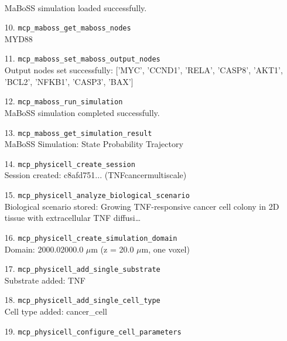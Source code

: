 \begin{enumerate}
\hfill\\
\RaggedRight MaBoSS simulation loaded successfully.
\item[10.] \texttt{mcp\_\allowbreak{}maboss\_\allowbreak{}get\_\allowbreak{}maboss\_\allowbreak{}nodes}
\hfill\\
\RaggedRight MYD88
\item[11.] \texttt{mcp\_\allowbreak{}maboss\_\allowbreak{}set\_\allowbreak{}maboss\_\allowbreak{}output\_\allowbreak{}nodes}
\hfill\\
\RaggedRight Output nodes set successfully: ['MYC', 'CCND1', 'RELA', 'CASP8', 'AKT1', 'BCL2', 'NFKB1', 'CASP3', 'BAX']
\item[12.] \texttt{mcp\_\allowbreak{}maboss\_\allowbreak{}run\_\allowbreak{}simulation}
\hfill\\
\RaggedRight MaBoSS simulation completed successfully.
\item[13.] \texttt{mcp\_\allowbreak{}maboss\_\allowbreak{}get\_\allowbreak{}simulation\_\allowbreak{}result}
\hfill\\
\RaggedRight MaBoSS Simulation: State Probability Trajectory
\item[14.] \texttt{mcp\_\allowbreak{}physicell\_\allowbreak{}create\_\allowbreak{}session}
\hfill\\
\RaggedRight Session created: c8afd751... (TNFcancermultiscale)
\item[15.] \texttt{mcp\_\allowbreak{}physicell\_\allowbreak{}analyze\_\allowbreak{}biological\_\allowbreak{}scenario}
\hfill\\
\RaggedRight Biological scenario stored: Growing TNF-responsive cancer cell colony in 2D tissue with extracellular TNF diffusi\ldots{}
\item[16.] \texttt{mcp\_\allowbreak{}physicell\_\allowbreak{}create\_\allowbreak{}simulation\_\allowbreak{}domain}
\hfill\\
\RaggedRight Domain: 2000.0\times{}2000.0 \ensuremath{\mu}m (z = 20.0 \ensuremath{\mu}m, one voxel)
\item[17.] \texttt{mcp\_\allowbreak{}physicell\_\allowbreak{}add\_\allowbreak{}single\_\allowbreak{}substrate}
\hfill\\
\RaggedRight Substrate added: TNF
\item[18.] \texttt{mcp\_\allowbreak{}physicell\_\allowbreak{}add\_\allowbreak{}single\_\allowbreak{}cell\_\allowbreak{}type}
\hfill\\
\RaggedRight Cell type added: cancer\_cell
\item[19.] \texttt{mcp\_\allowbreak{}physicell\_\allowbreak{}configure\_\allowbreak{}cell\_\allowbreak{}parameters}

\end{enumerate}
